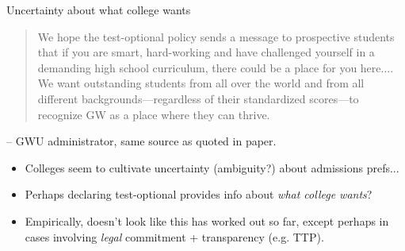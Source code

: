 \documentclass[11pt, aspectratio=169]{beamer}
\theoremstyle{plain}
\theoremstyle{plain}
\theoremstyle{plain}
\theoremstyle{plain}
\begin{document}
\begin{frame}{Uncertainty about what college wants}
    \begin{quotation}
        We hope the test-optional policy sends a message to prospective students that if you are smart, hard-working and have challenged yourself in a demanding high school curriculum, there could be a place for you here....
        We want outstanding students from all over the world and from all different backgrounds—regardless of their standardized scores—to recognize GW as a place where they can thrive.
    \end{quotation} -- GWU administrator, same source as quoted in paper.  \\ \pause

    \begin{itemize}
        \item Colleges seem to cultivate uncertainty (ambiguity?) about admissions prefs... \pause
        \item Perhaps declaring test-optional provides info about \emph{what college wants}? \pause
        \item Empirically, doesn't look like this has worked out so far, except perhaps in cases involving \emph{legal} commitment + transparency (e.g. TTP).
    \end{itemize}
\end{frame}
\end{document}
